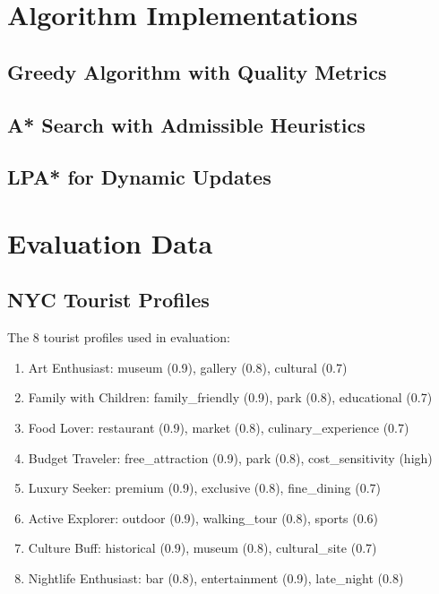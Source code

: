 \documentclass[12pt,a4paper,twoside]{report}
\theoremstyle{definition}
\begin{document}
\printbibliography[heading=bibintoc,title={References}]

\appendix

\chapter{Algorithm Implementations}
\section{Greedy Algorithm with Quality Metrics}


\section{A* Search with Admissible Heuristics}


\section{LPA* for Dynamic Updates}


\chapter{Evaluation Data}
\section{NYC Tourist Profiles}
The 8 tourist profiles used in evaluation:
\begin{enumerate}
    \item Art Enthusiast: museum (0.9), gallery (0.8), cultural (0.7)
    \item Family with Children: family\_friendly (0.9), park (0.8), educational (0.7)
    \item Food Lover: restaurant (0.9), market (0.8), culinary\_experience (0.7)
    \item Budget Traveler: free\_attraction (0.9), park (0.8), cost\_sensitivity (high)
    \item Luxury Seeker: premium (0.9), exclusive (0.8), fine\_dining (0.7)
    \item Active Explorer: outdoor (0.9), walking\_tour (0.8), sports (0.6)
    \item Culture Buff: historical (0.9), museum (0.8), cultural\_site (0.7)
    \item Nightlife Enthusiast: bar (0.8), entertainment (0.9), late\_night (0.8)
\end{enumerate}
\end{document}
